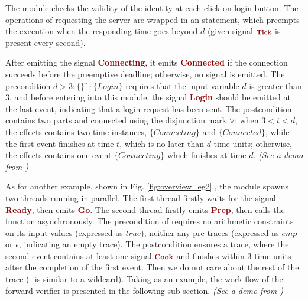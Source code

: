 \documentclass[acmsmall,10pt,review]{acmart}
\newcommand{\anyevent}[1]{{\textcolor{darkred}
{{\textbf{\footnotesize #1}}}}}
\newcommand{\code}[1]{{\tt{\ensuremath{\m{#1}}}}}
\newcommand{\m}{\mathit}
\newcommand\figref[1]{Fig. \textcolor{black}{\ref{#1}}.}
\begin{document}
The {} module checks the validity of the identity at each click on login button. The operations of requesting the server are wrapped in an {\textbf{\color{purple}}} statement, which preempts the execution when the responding time goes beyond \code{\m{d}} (given signal \code{\anyevent{Tick}} is present every second).


After emitting the signal \anyevent{Connecting}, it emits  \anyevent{Connected} if the connection succeeds before the  preemptive deadline; otherwise, no signal is emitted. 
The precondition \code{d{>}3 : \{
\}^\star \cdot\{\m{Login}\} } requires that the input variable \code{d} is greater than 3, and before entering into this module, the signal \anyevent{Login} should be emitted at the last event, indicating that a login request has been sent. 
The postcondition contains two parts and connected using the disjunction mark \code{{\vee}}: when \code{3{<}t{<}d}, the effects contains two time instances, \code{\{\m{Connecting}\}} and \code{\{\m{Connected}\}}, while the first  event finishes at time \code{t}, %
which is no later than \code{\m{d}} time units; otherwise, the effects contains one event \code{\{Connecting\}} which finishes at time \code{d}. \emph{(See a demo from \cite{CODE1})}



As for another example, shown in \figref{fig:overview_eg2}, the module {} %
spawns two threads running in  parallel.
The first thread firstly waits for the signal \anyevent{Ready}, then emits  \anyevent{Go}. 
The second thread firstly emits  \anyevent{Prep}, then calls the function {} asynchronously. 
The precondition of {} requires no arithmetic constraints on its input values (expressed as \code{\m{true}}), neither any pre-traces  (expressed as \code{\m{emp}} or \code{\epsilon}, indicating an empty trace). The postcondition ensures a trace, where the second event contains at least one signal \code{\anyevent{Cook}} and finishes within 3 time units after the completion of the first event. Then we do not care about the rest of the trace (\code{\_} is similar to a wildcard). 
Taking {} as an example, the work flow of the forward verifier is presented in the following sub-section. \emph{(See a demo from \cite{CODE2})}
\end{document}
